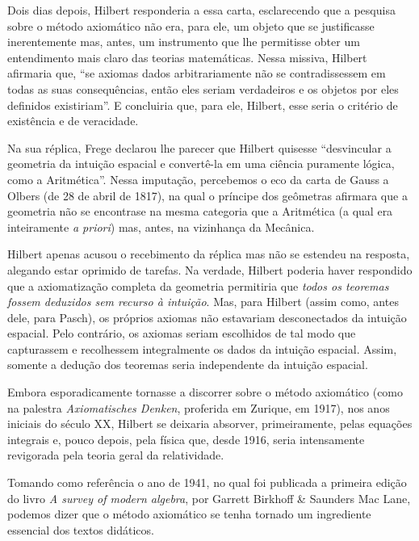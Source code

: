 \documentclass{hipatia}
\begin{document}
Dois dias depois, Hilbert responderia a essa carta, esclarecendo que a pesquisa sobre o método axiomático não era, para ele, um objeto que se justificasse inerentemente mas, antes, um instrumento que lhe permitisse obter um entendimento mais claro das teorias matemáticas. Nessa missiva, Hilbert afirmaria que, ``se axiomas dados arbitrariamente não se contradissessem em todas as suas consequências, então eles seriam verdadeiros e os objetos por eles definidos existiriam''. E concluiria que, para ele, Hilbert, esse seria o critério de existência e de veracidade.  \cite[p. 117]{corry1997a}

Na sua réplica, Frege declarou lhe parecer que Hilbert quisesse ``desvincular a geometria da intuição espacial e convertê-la em uma ciência puramente lógica, como a Aritmética''. Nessa imputação, percebemos o eco da carta de Gauss a Olbers  (de 28 de abril de 1817), na qual o príncipe dos geômetras afirmara que a geometria não se encontrase na mesma categoria que a Aritmética  (a qual era inteiramente \emph{a priori})  mas, antes, na vizinhança da Mecânica. \cite[p. 117]{corry1997a}\cite[p. 113]{mosterin1984}\cite[p. 382]{belna2002}  

Hilbert apenas acusou o recebimento da réplica mas não se estendeu na resposta, alegando estar oprimido de tarefas. Na verdade, Hilbert poderia haver respondido que a axiomatização completa da geometria permitiria que \emph{todos os teoremas fossem deduzidos sem recurso à intuição}. Mas, para Hilbert (assim como, antes dele, para Pasch), os próprios axiomas não estavariam desconectados da intuição espacial. Pelo contrário, os axiomas seriam escolhidos de tal modo que capturassem e recolhessem integralmente os dados da intuição espacial. Assim, somente a dedução dos teoremas seria independente da intuição espacial. \cite[p. 117]{corry1997a}

Embora esporadicamente tornasse a discorrer sobre o método axiomático (como na palestra \emph{Axiomatisches Denken}, proferida em Zurique, em 1917), nos anos iniciais do século XX, Hilbert se deixaria absorver, primeiramente, pelas equações integrais e, pouco depois, pela física que, desde 1916, seria intensamente revigorada pela teoria geral da relatividade.

Tomando como referência o ano de 1941, no qual foi publicada a primeira edição do livro \emph{A survey of modern algebra}, por Garrett Birkhoff \& Saunders Mac Lane, podemos dizer que o método axiomático se tenha tornado um ingrediente essencial dos textos didáticos.
\end{document}
